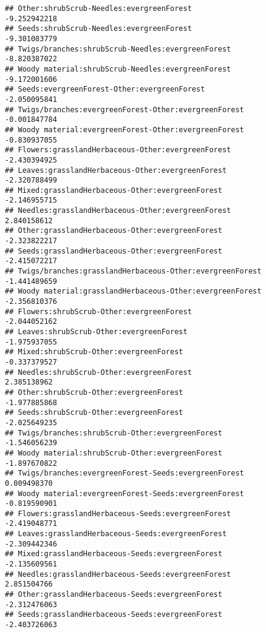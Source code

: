 \documentclass[
]{article}
\begin{document}
\begin{verbatim}
## Other:shrubScrub-Needles:evergreenForest                              -9.252942218
## Seeds:shrubScrub-Needles:evergreenForest                              -9.301083779
## Twigs/branches:shrubScrub-Needles:evergreenForest                     -8.820387022
## Woody material:shrubScrub-Needles:evergreenForest                     -9.172001606
## Seeds:evergreenForest-Other:evergreenForest                           -2.050095841
## Twigs/branches:evergreenForest-Other:evergreenForest                  -0.001847784
## Woody material:evergreenForest-Other:evergreenForest                  -0.830937055
## Flowers:grasslandHerbaceous-Other:evergreenForest                     -2.430394925
## Leaves:grasslandHerbaceous-Other:evergreenForest                      -2.320788499
## Mixed:grasslandHerbaceous-Other:evergreenForest                       -2.146955715
## Needles:grasslandHerbaceous-Other:evergreenForest                      2.840158612
## Other:grasslandHerbaceous-Other:evergreenForest                       -2.323822217
## Seeds:grasslandHerbaceous-Other:evergreenForest                       -2.415072217
## Twigs/branches:grasslandHerbaceous-Other:evergreenForest              -1.441489659
## Woody material:grasslandHerbaceous-Other:evergreenForest              -2.356810376
## Flowers:shrubScrub-Other:evergreenForest                              -2.044052162
## Leaves:shrubScrub-Other:evergreenForest                               -1.975937055
## Mixed:shrubScrub-Other:evergreenForest                                -0.337379527
## Needles:shrubScrub-Other:evergreenForest                               2.385138962
## Other:shrubScrub-Other:evergreenForest                                -1.977885868
## Seeds:shrubScrub-Other:evergreenForest                                -2.025649235
## Twigs/branches:shrubScrub-Other:evergreenForest                       -1.546056239
## Woody material:shrubScrub-Other:evergreenForest                       -1.897670822
## Twigs/branches:evergreenForest-Seeds:evergreenForest                   0.009498370
## Woody material:evergreenForest-Seeds:evergreenForest                  -0.819590901
## Flowers:grasslandHerbaceous-Seeds:evergreenForest                     -2.419048771
## Leaves:grasslandHerbaceous-Seeds:evergreenForest                      -2.309442346
## Mixed:grasslandHerbaceous-Seeds:evergreenForest                       -2.135609561
## Needles:grasslandHerbaceous-Seeds:evergreenForest                      2.851504766
## Other:grasslandHerbaceous-Seeds:evergreenForest                       -2.312476063
## Seeds:grasslandHerbaceous-Seeds:evergreenForest                       -2.403726063

\end{verbatim}
\end{document}
